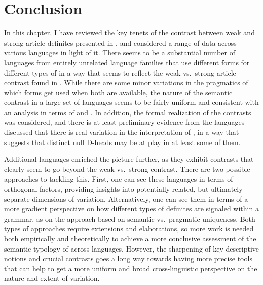 \documentclass[output=paper
,modfonts
,nonflat]{langscibook}
\begin{document}
\section{Conclusion}

In this chapter, I have reviewed the key tenets of the contrast
between weak and strong article definites presented in
\citet{Schwarz2009}, and considered a range of data across various
languages in light of it. There seems to be a substantial number of
languages from entirely unrelated language families that use different
forms for different types of  in a way that seems
to reflect the weak vs.\ strong article contrast found in
. While there are some minor variations in the pragmatics of
which forms get used when both are available, the nature of the
semantic contrast in a large set of languages seems to be fairly
uniform and consistent with an analysis in terms of  and . In addition, the formal realization of
the contrasts was considered, and there is at least preliminary
evidence from the languages discussed that there is real variation in
the interpretation of , in a way that suggests that
distinct null D-heads may be at play in at least some of them.

Additional languages enriched the picture further, as they exhibit
contrasts that clearly seem to go beyond the weak vs.\ strong contrast. There are two
possible approaches to tackling this. First, one can see these
languages in terms of orthogonal factors, providing insights into
potentially related, but ultimately separate dimensions of
variation. Alternatively, one can see them in terms of a more gradient
perspective on how different types of definites are signaled within a
grammar, as on the approach based on semantic vs.\ pragmatic
uniqueness. Both types of approaches require extensions and
elaborations, so
more work is needed both empirically and theoretically to achieve a
more conclusive assessment of the semantic typology of 
across languages. However, the sharpening of key descriptive notions
and crucial contrasts goes a long way towards having more precise tools
that can help to get a more uniform and broad cross-linguistic
perspective on the nature and extent of variation.

{\sloppy
\printbibliography[heading=subbibliography,notkeyword=this]
}
\end{document}

